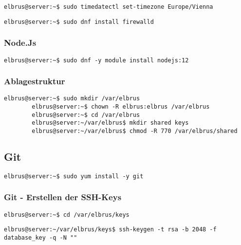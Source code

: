\documentclass{article}
\begin{document}
	\begin{lstlisting}[caption={Setzen der Zeitzone auf 'Europa/Wien'.}]
		elbrus@server:~$ sudo timedatectl set-timezone Europe/Vienna
	\end{lstlisting}

	\begin{lstlisting}[caption={Installieren von dem 'firewalld' Service.}]
		elbrus@server:~$ sudo dnf install firewalld
	\end{lstlisting}
	
	\subsubsection{Node.Js}
	\begin{lstlisting}[caption={Installieren des Framworks 'Node.Js'.}]
		elbrus@server:~$ sudo dnf -y module install nodejs:12
	\end{lstlisting}
	
	\subsubsection{Ablagestruktur}
	\lstset{style=commands}
	\begin{lstlisting}[caption={Anlegen der Verzeichnissstruktur.}]
		elbrus@server:~$ sudo mkdir /var/elbrus
		elbrus@server:~$ chown -R elbrus:elbrus /var/elbrus
		elbrus@server:~$ cd /var/elbrus
		elbrus@server:~/var/elbrus$ mkdir shared keys
		elbrus@server:~/var/elbrus$ chmod -R 770 /var/elbrus/shared
	\end{lstlisting}

	\newpage
	\lstset{style=commands}
	\subsection{Git}
	\begin{lstlisting}[caption={Installieren von dem VCS 'git'.}]
		elbrus@server:~$ sudo yum install -y git
	\end{lstlisting}
	\subsubsection{Git - Erstellen der SSH-Keys}
	\begin{lstlisting}[caption={Wechseln des Verzeichnisses.}]
		elbrus@server:~$ cd /var/elbrus/keys
	\end{lstlisting}
	

	\begin{lstlisting}[caption={Erstellen des SSH-keys der für das Herunterladen der 'Database' benötigt wird.}]
		elbrus@server:~/var/elbrus/keys$ ssh-keygen -t rsa -b 2048 -f database_key -q -N ""
	\end{lstlisting}
\end{document}
